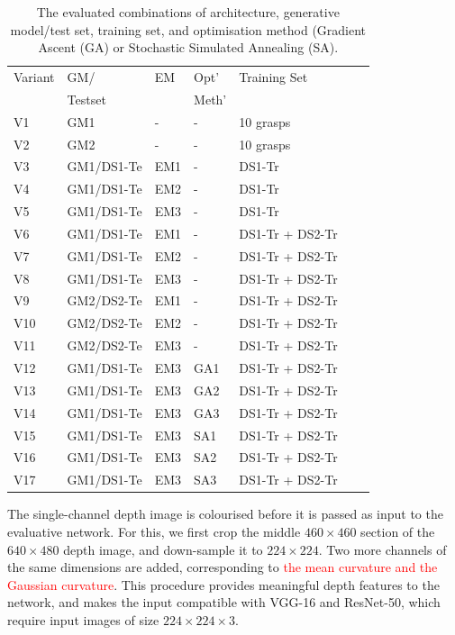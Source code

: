 \begin{table}[b]
\footnotesize
\centering
\begin{tabular}{|l|l|l|l|l|l|l|}
\hline
Variant & GM/  & EM & Opt'  & Training Set \\ 
 & Testset & & Meth' & \\ \hline
V1 & GM1    & - & - & 10 grasps  \\ \hline
V2 & GM2    & - & - & 10 grasps  \\ \hline
V3 & GM1/DS1-Te & EM1 & - & DS1-Tr \\ \hline
V4 & GM1/DS1-Te & EM2 & - & DS1-Tr \\ \hline
V5 & GM1/DS1-Te & EM3 & - & DS1-Tr  \\ \hline
V6 & GM1/DS1-Te & EM1 & - & DS1-Tr + DS2-Tr \\ \hline
V7 & GM1/DS1-Te & EM2 & - & DS1-Tr + DS2-Tr \\ \hline
V8 & GM1/DS1-Te & EM3 & - & DS1-Tr + DS2-Tr \\ \hline
V9 & GM2/DS2-Te & EM1 & - & DS1-Tr + DS2-Tr \\ \hline
V10 & GM2/DS2-Te & EM2 & - & DS1-Tr + DS2-Tr \\ \hline
V11 & GM2/DS2-Te & EM3 & - & DS1-Tr + DS2-Tr \\ \hline
V12 & GM1/DS1-Te & EM3 & GA1 & DS1-Tr + DS2-Tr \\ \hline
V13 & GM1/DS1-Te & EM3 & GA2 & DS1-Tr + DS2-Tr \\ \hline
V14 & GM1/DS1-Te & EM3 & GA3 & DS1-Tr + DS2-Tr \\ \hline
V15 & GM1/DS1-Te & EM3 & SA1 & DS1-Tr + DS2-Tr \\ \hline
V16 & GM1/DS1-Te & EM3 & SA2 & DS1-Tr + DS2-Tr \\ \hline
V17 & GM1/DS1-Te & EM3 & SA3 & DS1-Tr + DS2-Tr \\ \hline
\end{tabular}
\caption{The evaluated combinations of architecture, generative model/test set, training set, and optimisation method (Gradient Ascent (GA) or Stochastic Simulated Annealing (SA).}
\label{table:GEBreakdown}
\end{table}

The single-channel depth image is colourised before it is passed as input to the evaluative network. For this, we first crop the middle $460 \times 460$ section of the $640 \times 480$ depth image, and down-sample it to $224 \times 224$. Two more channels of the same dimensions are added, corresponding to \textcolor{red}{the mean curvature and the Gaussian curvature}. %
This procedure provides meaningful depth features to the network, and makes the input compatible with VGG-16 and ResNet-50, which require input images of size $224 \times 224 \times 3$.

